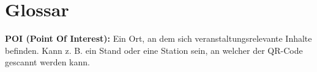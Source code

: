 \chapter{Glossar}

\textbf{POI (Point Of Interest):} Ein Ort, an dem sich veranstaltungsrelevante Inhalte befinden. Kann z. B. ein Stand oder eine Station sein, an welcher der QR-Code gescannt werden kann.
